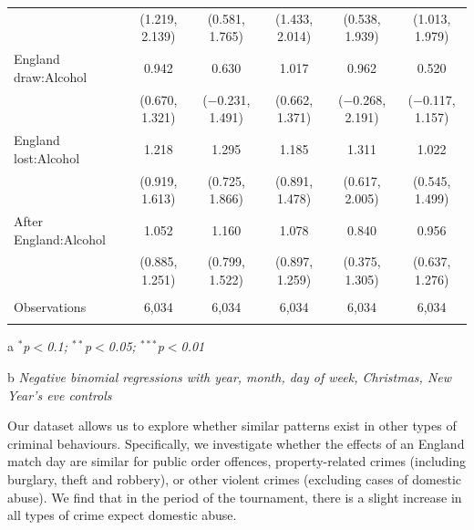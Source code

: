 \documentclass[12pt, letterpaper]{article}
\begin{document}
\begin{table}[htb]
{\begin{threeparttable}
\begin{tabular}{@{\extracolsep{5pt}}lccccc}
  & (1.219, 2.139) & (0.581, 1.765) & (1.433, 2.014) & (0.538, 1.939) & (1.013, 1.979) \\ 
  England draw:Alcohol & 0.942 & 0.630 & 1.017 & 0.962 & 0.520 \\ 
  & (0.670, 1.321) & ($-$0.231, 1.491) & (0.662, 1.371) & ($-$0.268, 2.191) & ($-$0.117, 1.157) \\ 
  England lost:Alcohol & 1.218 & 1.295 & 1.185 & 1.311 & 1.022 \\ 
  & (0.919, 1.613) & (0.725, 1.866) & (0.891, 1.478) & (0.617, 2.005) & (0.545, 1.499) \\ 
  After England:Alcohol & 1.052 & 1.160 & 1.078 & 0.840 & 0.956 \\ 
  & (0.885, 1.251) & (0.799, 1.522) & (0.897, 1.259) & (0.375, 1.305) & (0.637, 1.276) \\ 
 \hline \\[-1.8ex] 
Observations & 6,034 & 6,034 & 6,034 & 6,034 & 6,034 \\ 
\hline 
\hline \\[-1.8ex] 
\end{tabular} 
\begin{tablenotes}
      \item[a] \textit{$^{*}$p$<$0.1; $^{**}$p$<$0.05; $^{***}$p$<$0.01}
      \item[b] \textit{Negative binomial regressions with year, month, day of week, Christmas, New Year's eve controls}
    \end{tablenotes}
\end{threeparttable} }
\end{table}

Our dataset allows us to explore whether similar patterns exist in other types of criminal behaviours. Specifically, we investigate whether the effects of an England match day are similar for public order offences, property-related crimes (including burglary, theft and robbery), or other violent crimes (excluding cases of domestic abuse). We find that in the period of the tournament, there is a slight increase in all types of crime expect domestic abuse.
\end{document}
